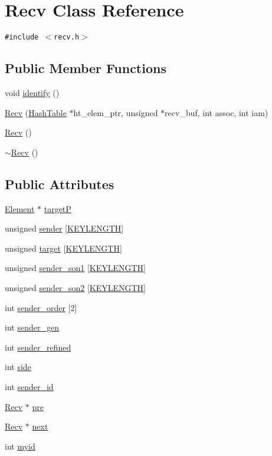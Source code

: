 \hypertarget{classRecv}{
\section{Recv Class Reference}
\label{classRecv}
}
{\tt \#include $<$recv.h$>$}

\subsection*{Public Member Functions}
\begin{CompactItemize}
\item 
void \hyperlink{classRecv_a0}{identify} ()
\item 
\hyperlink{classRecv_a1}{Recv} (\hyperlink{classHashTable}{Hash\-Table} $\ast$ht\_\-elem\_\-ptr, unsigned $\ast$recv\_\-buf, int assoc, int iam)
\item 
\hyperlink{classRecv_a2}{Recv} ()
\item 
\hyperlink{classRecv_a3}{$\sim$Recv} ()
\end{CompactItemize}
\subsection*{Public Attributes}
\begin{CompactItemize}
\item 
\hyperlink{classElement}{Element} $\ast$ \hyperlink{classRecv_o0}{target\-P}
\item 
unsigned \hyperlink{classRecv_o1}{sender} \mbox{[}\hyperlink{constant_8h_a10}{KEYLENGTH}\mbox{]}
\item 
unsigned \hyperlink{classRecv_o2}{target} \mbox{[}\hyperlink{constant_8h_a10}{KEYLENGTH}\mbox{]}
\item 
unsigned \hyperlink{classRecv_o3}{sender\_\-son1} \mbox{[}\hyperlink{constant_8h_a10}{KEYLENGTH}\mbox{]}
\item 
unsigned \hyperlink{classRecv_o4}{sender\_\-son2} \mbox{[}\hyperlink{constant_8h_a10}{KEYLENGTH}\mbox{]}
\item 
int \hyperlink{classRecv_o5}{sender\_\-order} \mbox{[}2\mbox{]}
\item 
int \hyperlink{classRecv_o6}{sender\_\-gen}
\item 
int \hyperlink{classRecv_o7}{sender\_\-refined}
\item 
int \hyperlink{classRecv_o8}{side}
\item 
int \hyperlink{classRecv_o9}{sender\_\-id}
\item 
\hyperlink{classRecv}{Recv} $\ast$ \hyperlink{classRecv_o10}{pre}
\item 
\hyperlink{classRecv}{Recv} $\ast$ \hyperlink{classRecv_o11}{next}
\item 
int \hyperlink{classRecv_o12}{myid}
\end{CompactItemize}


